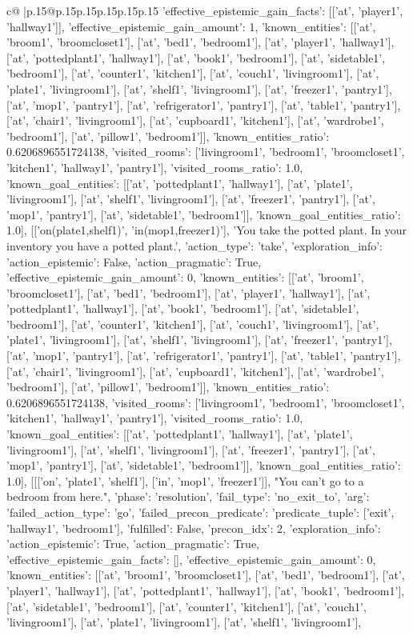 \documentclass{article}
\begin{document}
{\begin{supertabular}{c@{$\;$}|p{.15\linewidth}@{}p{.15\linewidth}p{.15\linewidth}p{.15\linewidth}p{.15\linewidth}p{.15\linewidth}}
{{{'effective_epistemic_gain_facts': [['at', 'player1', 'hallway1']], 'effective_epistemic_gain_amount': 1, 'known_entities': [['at', 'broom1', 'broomcloset1'], ['at', 'bed1', 'bedroom1'], ['at', 'player1', 'hallway1'], ['at', 'pottedplant1', 'hallway1'], ['at', 'book1', 'bedroom1'], ['at', 'sidetable1', 'bedroom1'], ['at', 'counter1', 'kitchen1'], ['at', 'couch1', 'livingroom1'], ['at', 'plate1', 'livingroom1'], ['at', 'shelf1', 'livingroom1'], ['at', 'freezer1', 'pantry1'], ['at', 'mop1', 'pantry1'], ['at', 'refrigerator1', 'pantry1'], ['at', 'table1', 'pantry1'], ['at', 'chair1', 'livingroom1'], ['at', 'cupboard1', 'kitchen1'], ['at', 'wardrobe1', 'bedroom1'], ['at', 'pillow1', 'bedroom1']], 'known_entities_ratio': 0.6206896551724138, 'visited_rooms': ['livingroom1', 'bedroom1', 'broomcloset1', 'kitchen1', 'hallway1', 'pantry1'], 'visited_rooms_ratio': 1.0, 'known_goal_entities': [['at', 'pottedplant1', 'hallway1'], ['at', 'plate1', 'livingroom1'], ['at', 'shelf1', 'livingroom1'], ['at', 'freezer1', 'pantry1'], ['at', 'mop1', 'pantry1'], ['at', 'sidetable1', 'bedroom1']], 'known_goal_entities_ratio': 1.0}}], [['on(plate1,shelf1)', 'in(mop1,freezer1)'], 'You take the potted plant. In your inventory you have a potted plant.', {'action_type': 'take', 'exploration_info': {'action_epistemic': False, 'action_pragmatic': True, 'effective_epistemic_gain_amount': 0, 'known_entities': [['at', 'broom1', 'broomcloset1'], ['at', 'bed1', 'bedroom1'], ['at', 'player1', 'hallway1'], ['at', 'pottedplant1', 'hallway1'], ['at', 'book1', 'bedroom1'], ['at', 'sidetable1', 'bedroom1'], ['at', 'counter1', 'kitchen1'], ['at', 'couch1', 'livingroom1'], ['at', 'plate1', 'livingroom1'], ['at', 'shelf1', 'livingroom1'], ['at', 'freezer1', 'pantry1'], ['at', 'mop1', 'pantry1'], ['at', 'refrigerator1', 'pantry1'], ['at', 'table1', 'pantry1'], ['at', 'chair1', 'livingroom1'], ['at', 'cupboard1', 'kitchen1'], ['at', 'wardrobe1', 'bedroom1'], ['at', 'pillow1', 'bedroom1']], 'known_entities_ratio': 0.6206896551724138, 'visited_rooms': ['livingroom1', 'bedroom1', 'broomcloset1', 'kitchen1', 'hallway1', 'pantry1'], 'visited_rooms_ratio': 1.0, 'known_goal_entities': [['at', 'pottedplant1', 'hallway1'], ['at', 'plate1', 'livingroom1'], ['at', 'shelf1', 'livingroom1'], ['at', 'freezer1', 'pantry1'], ['at', 'mop1', 'pantry1'], ['at', 'sidetable1', 'bedroom1']], 'known_goal_entities_ratio': 1.0}}], [[['on', 'plate1', 'shelf1'], ['in', 'mop1', 'freezer1']], "You can't go to a bedroom from here.", {'phase': 'resolution', 'fail_type': 'no_exit_to', 'arg': {'failed_action_type': 'go', 'failed_precon_predicate': {'predicate_tuple': ['exit', 'hallway1', 'bedroom1'], 'fulfilled': False, 'precon_idx': 2}}, 'exploration_info': {'action_epistemic': True, 'action_pragmatic': True, 'effective_epistemic_gain_facts': [], 'effective_epistemic_gain_amount': 0, 'known_entities': [['at', 'broom1', 'broomcloset1'], ['at', 'bed1', 'bedroom1'], ['at', 'player1', 'hallway1'], ['at', 'pottedplant1', 'hallway1'], ['at', 'book1', 'bedroom1'], ['at', 'sidetable1', 'bedroom1'], ['at', 'counter1', 'kitchen1'], ['at', 'couch1', 'livingroom1'], ['at', 'plate1', 'livingroom1'], ['at', 'shelf1', 'livingroom1'], }}}
\end{supertabular}}
\end{document}
